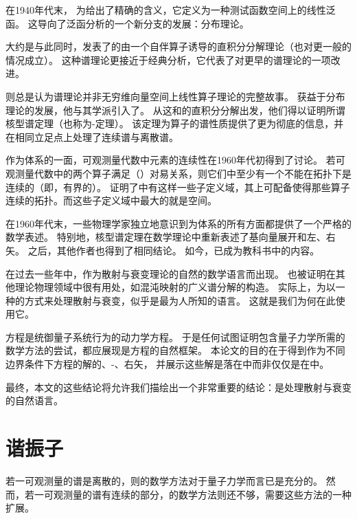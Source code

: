 在1940年代末，%
为\deltafunc 给出了精确的含义，它定义为一种测试函数空间上的线性泛函。
这导向了泛函分析的一个新分支的发展：分布理论。%

大约是与此同时，\neumann 发表了\hs 的由一个自伴算子诱导的直积分分解理论（也对更一般的情况成立）。%
这种谱理论更接近于经典\fourier 分析，它代表了对更早的\neumann 谱理论的一项改进。%

则总是认为\neumann 谱理论并非无穷维向量空间上线性算子理论的完整故事。
获益于分布理论的发展，他与其学派引入了。
从这\rhs 和\neumann 的直积分分解出发，他们得以证明所谓核型谱定理（也称为\gelfand-\maurin 定理）。%
该定理为算子的谱性质提供了更为彻底的信息，并在相同立足点上处理了连续谱与离散谱。

作为\dirac 体系的一面，可观测量代数中元素的连续性在1960年代初得到了讨论。%
若可观测量代数中的两个算子满足\canonical（\heisenberg）对易关系，则它们中至少有一个不能在\hs 拓扑下是连续的（即，有界的）。
证明了\hs 中有这样一些子定义域，其上可配备使得那些算子连续的拓扑。而这些子定义域中最大的就是\schwartz 空间。

在1960年代末，一些物理学家独立地意识到\RHS 为\dirac 体系的所有方面都提供了一个严格的数学表述。%
特别地，核型谱定理在数学理论中重新表述了\dirac 基向量展开和\dirac 左、右矢。
之后，其他作者也得到了相同结论。%
如今，\RHS 已成为教科书中的内容。%

在过去一些年中，\RHS 作为散射与衰变理论的自然的数学语言而出现。%
\RHS 也被证明在其他理论物理领域中很有用处，如混沌映射的广义谱分解的构造。%
实际上，为以一种的方式来处理散射与衰变，\RHS 似乎是最为人所知的语言。
这就是我们为何在此使用它。

\schrodinger 方程是统御量子系统行为的动力学方程。
于是任何试图证明\RHS 包含量子力学所需的数学方法的尝试，都应展现\RHS 是\schrodinger 方程的自然框架。
本论文的目的在于得到作为不同边界条件下\schrodinger 方程的解的\dirac、\lippmann-\schwinger、\gamow 右矢，
并展示这些解是落在\RHS 中而非仅仅是在\HS 中。%

最终，本文的这些结论将允许我们描绘出一个非常重要的结论：\RHS 是处理散射与衰变的自然语言。

\section{谐振子}

若一可观测量的谱是离散的，则\hs 的数学方法对于量子力学而言已是充分的。
然而，若一可观测量的谱有连续的部分，\hs 的数学方法则还不够，需要这些方法的一种扩展。


